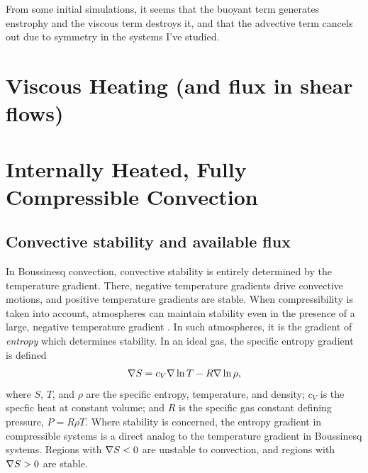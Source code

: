 From some initial simulations, it seems that the buoyant term generates enstrophy and the viscous term destroys it, and that the advective term cancels out due to symmetry in the systems I've studied.

\section{Viscous Heating (and flux in shear flows)}

\section{Internally Heated, Fully Compressible Convection}
\label{sec:internally_heated}

\subsection{Convective stability and available flux}
\label{sec:stability}
In Boussinesq convection, convective stability is entirely determined by the temperature gradient.
There, negative temperature gradients drive convective motions, and positive temperature gradients are stable.
When compressibility is taken into account, atmospheres can maintain stability even in the presence of a large, negative temperature gradient \cite{spiegel&veronis1960}.
In such atmospheres, it is the gradient of \emph{entropy} which determines stability.
In an ideal gas, the specific entropy gradient is defined
\begin{equation}
\nabla S = c_V \nabla\ln T - R \nabla\ln\rho,
\end{equation}
where $S$, $T$, and $\rho$ are the specific entropy, temperature, and density; $c_V$ is the specfic heat at constant volume; and $R$ is the specific gas constant defining pressure, $P = R \rho T$.
Where stability is concerned, the entropy gradient in compressible systems is a direct analog to the temperature gradient in Boussinesq systems.
Regions with $\nabla S < 0$ are unstable to convection, and regions with $\nabla S > 0$ are stable.

